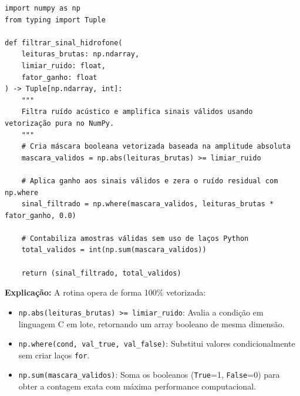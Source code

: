 \ifmostrarGabarito
\begin{verbatim}
import numpy as np
from typing import Tuple

def filtrar_sinal_hidrofone(
    leituras_brutas: np.ndarray,
    limiar_ruido: float,
    fator_ganho: float
) -> Tuple[np.ndarray, int]:
    """
    Filtra ruído acústico e amplifica sinais válidos usando vetorização pura no NumPy.
    """
    # Cria máscara booleana vetorizada baseada na amplitude absoluta
    mascara_validos = np.abs(leituras_brutas) >= limiar_ruido
    
    # Aplica ganho aos sinais válidos e zera o ruído residual com np.where
    sinal_filtrado = np.where(mascara_validos, leituras_brutas * fator_ganho, 0.0)
    
    # Contabiliza amostras válidas sem uso de laços Python
    total_validos = int(np.sum(mascara_validos))
    
    return (sinal_filtrado, total_validos)
\end{verbatim}

\textbf{Explicação:}
A rotina opera de forma 100\% vetorizada:
\begin{itemize}[leftmargin=*]
    \item \texttt{np.abs(leituras\_brutas) >= limiar\_ruido}: Avalia a condição em linguagem C em lote, retornando um array booleano de mesma dimensão.
    \item \texttt{np.where(cond, val\_true, val\_false)}: Substitui valores condicionalmente sem criar laços \texttt{for}.
    \item \texttt{np.sum(mascara\_validos)}: Soma os booleanos (\texttt{True}=1, \texttt{False}=0) para obter a contagem exata com máxima performance computacional.
\end{itemize}
\fi
